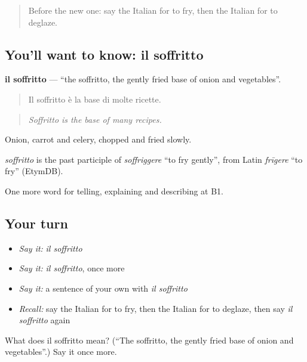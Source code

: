 \label{lesson:IT-C334-soffritto}



\begin{quote}
Before the new one: say the Italian for to fry, then the Italian for to deglaze.
\end{quote}

\subsection*{You'll want to know: il soffritto}
\textbf{il soffritto} — \textquotedblleft{}the soffritto, the gently fried base of onion and vegetables\textquotedblright{}.

\begin{quote}
Il soffritto è la base di molte ricette.
\end{quote}

\begin{quote}
\emph{Soffritto is the base of many recipes.}
\end{quote}

Onion, carrot and celery, chopped and fried slowly.

\begin{cousinweb}
\emph{soffritto} is the past participle of \emph{soffriggere} \textquotedblleft{}to fry gently\textquotedblright{}, from Latin \emph{frīgere} \textquotedblleft{}to fry\textquotedblright{} (EtymDB).
\end{cousinweb}

\begin{grammarlens}[title={What you've built}]
One more word for telling, explaining and describing at B1.
\end{grammarlens}

\subsection*{Your turn}
\begin{itemize}
\raggedright
  \item \emph{Say it:} \emph{il soffritto}
  \item \emph{Say it:} \emph{il soffritto}, once more
  \item \emph{Say it:} a sentence of your own with \emph{il soffritto}
  \item \emph{Recall:} say the Italian for to fry, then the Italian for to deglaze, then say \emph{il soffritto} again
\end{itemize}

\begin{tcolorbox}[breakable,colback=teal!4,colframe=teal!35!black,title={Before you move on}]
What does il soffritto mean? (\textquotedblleft{}The soffritto, the gently fried base of onion and vegetables\textquotedblright{}.) Say it once more.
\end{tcolorbox}
